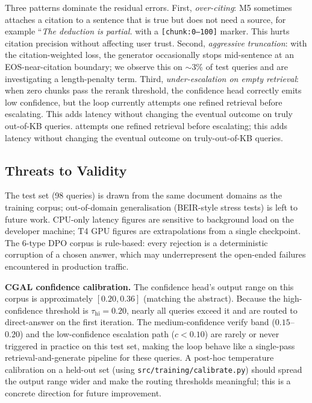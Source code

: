 \documentclass[11pt,a4paper,twocolumn]{article}
\begin{document}
Three patterns dominate the residual errors. First, \textit{over-citing}:
M5 sometimes attaches a citation to a sentence that is true but does not
need a source, for example ``\textit{The deduction is partial.} with a
\texttt{[chunk:0--100]} marker. This hurts citation precision without
affecting user trust. Second, \textit{aggressive truncation}: with the
citation-weighted loss, the generator occasionally stops mid-sentence at
an EOS-near-citation boundary; we observe this on $\sim$3\% of test
queries and are investigating a length-penalty term. Third,
\textit{under-escalation on empty retrieval}: when zero chunks pass the
rerank threshold, the confidence head correctly emits low confidence, but
the loop currently attempts one refined retrieval before escalating. This
adds latency without changing the eventual outcome on truly out-of-KB
queries.
attempts one refined retrieval before escalating; this adds latency
without changing the eventual outcome on truly-out-of-KB queries.

\subsection{Threats to Validity}

The test set (98 queries) is drawn from the same document
domains as the training corpus; out-of-domain generalisation
(BEIR-style stress tests) is left to future work. CPU-only latency
figures are sensitive to background load on the developer machine;
T4 GPU figures are extrapolations from a single checkpoint. The
6-type DPO corpus is rule-based: every rejection is a deterministic
corruption of a chosen answer, which may underrepresent the open-ended
failures encountered in production traffic.

\textbf{CGAL confidence calibration.} The confidence head's output
range on this corpus is approximately $[0.20, 0.36]$ (matching the
abstract). Because the high-confidence threshold is $\tau_{\text{hi}}{=}0.20$,
nearly all queries exceed it and are routed to direct-answer on the
first iteration. The medium-confidence verify band ($0.15$--$0.20$)
and the low-confidence escalation path ($c{<}0.10$) are rarely or never
triggered in practice on this test set, making the loop behave like a
single-pass retrieval-and-generate pipeline for these queries. A
post-hoc temperature calibration on a held-out set (using
\texttt{src/training/calibrate.py}) should spread the output range
wider and make the routing thresholds meaningful; this is a concrete
direction for future improvement.
\end{document}
